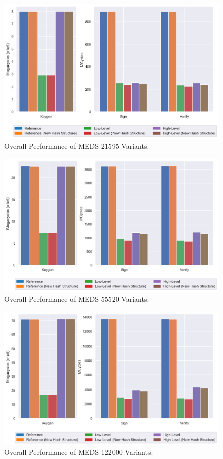 \documentclass[11pt,a4paper]{report}
\theoremstyle{definition}
\begin{document}
\begin{figure}
  \centering
  \includegraphics[width=\textwidth]{plots/barplot_MEDS-21595.png}
  \caption{Overall Performance of MEDS-21595 Variants.}
  \label{fig:overal_performance_bar_chart_MEDS-21595}
\end{figure}

\begin{figure}
  \centering
  \includegraphics[width=\textwidth]{plots/barplot_MEDS-55520.png}
  \caption{Overall Performance of MEDS-55520 Variants.}
  \label{fig:overal_performance_bar_chart_MEDS-55520}
\end{figure}

\begin{figure}
  \centering
  \includegraphics[width=\textwidth]{plots/barplot_MEDS-122000.png}
  \caption{Overall Performance of MEDS-122000 Variants.}
  \label{fig:overal_performance_bar_chart_MEDS-122000}
\end{figure}
\end{document}
